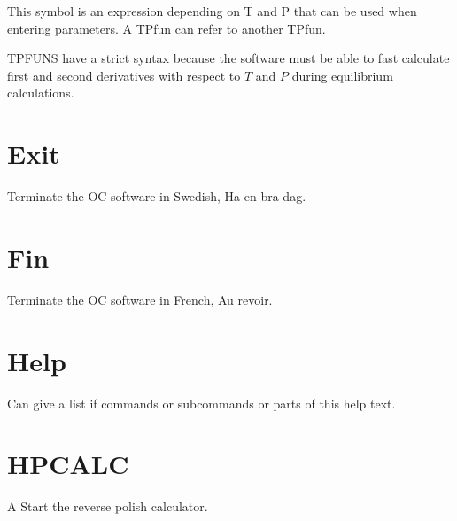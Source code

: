 \documentclass[12pt]{article}
\begin{document}
This symbol is an expression depending on T and P that can be used
when entering parameters.  A TPfun can refer to another TPfun.

TPFUNS have a strict syntax because the software must be able to
fast calculate first and second derivatives with respect to $T$ and
$P$ during equilibrium calculations.

\section{Exit }

Terminate the OC software in Swedish, Ha en bra dag.

\section{Fin }

Terminate the OC software in French, Au revoir.

\section{Help }

Can give a list if commands or subcommands or parts of this help text.

\section{HPCALC }

A Start the reverse polish calculator.
\end{document}
